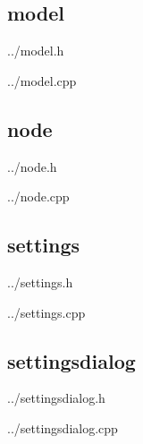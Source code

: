  \subsection{model}
 
	{../model.h}
 
	{../model.cpp}

 \subsection{node}
 
	{../node.h}
 
	{../node.cpp}

 \subsection{settings}
 
	{../settings.h}
 
	{../settings.cpp}

 \subsection{settingsdialog}
 
	{../settingsdialog.h}
 
	{../settingsdialog.cpp}

